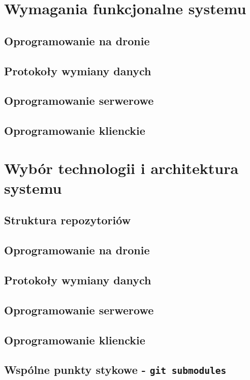\chapter{Wymagania funkcjonalne systemu}

\section{Oprogramowanie na dronie}
\section{Protokoły wymiany danych}
\section{Oprogramowanie serwerowe}
\section{Oprogramowanie klienckie}


\chapter{Wybór technologii i architektura systemu}

\section{Struktura repozytoriów}
\section{Oprogramowanie na dronie}
\section{Protokoły wymiany danych}
\section{Oprogramowanie serwerowe}
\section{Oprogramowanie klienckie}

\section{Wspólne punkty stykowe - \texttt{git submodules}}

